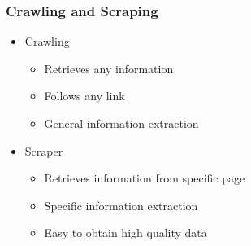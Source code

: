
\begin{frame}
    \frametitle{Crawling and Scraping}
\begin{itemize}
    \item Crawling
    \begin{itemize}
        \item Retrieves any information
        \item Follows any link
        \item General information extraction
    \end{itemize}
\end{itemize}

\begin{itemize}
    \item Scraper
    \begin{itemize}
        \item Retrieves information from specific page
        \item Specific information extraction
        \item Easy to obtain high quality data
    \end{itemize}
\end{itemize}
\end{frame}

